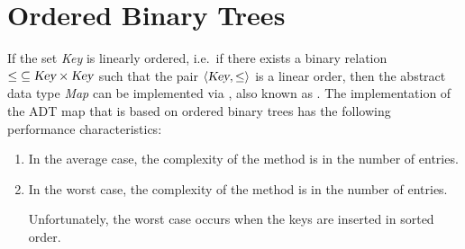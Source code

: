 \section{Ordered Binary Trees}
If the set \textsl{Key} is linearly ordered, i.e.~if there exists a binary relation
$\leq \;\subseteq\textsl{Key}\times\textsl{Key}$ such that the pair $\langle \textsl{Key}, \leq \rangle$ is a linear
order, then the abstract data type \textsl{Map} can be implemented via  
\href{https://en.wikipedia.org/wiki/Binary_search_tree}{}, also known as
. 
The implementation of the ADT map that is based on ordered binary trees has the following performance
characteristics: 
\begin{enumerate}
\item In the average case, the complexity of the method  is  in the number of entries.
\item In the worst case, the complexity of the method  is  in the number of entries.

      Unfortunately, the worst case occurs when the keys are inserted in sorted order.
\end{enumerate}

